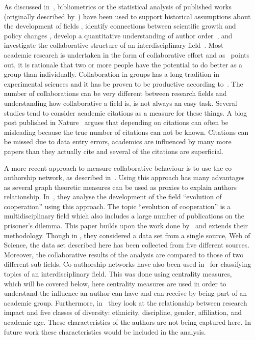 \documentclass{article}
\theoremstyle{definition}
\begin{document}
As discussed in~\cite{youngblood2018}, bibliometrics or the statistical analysis
of published works (originally described by~\cite{pritchard1969}) 
have been used to support historical assumptions about the development of fields
\cite{raina1998}, identify connections between scientific growth and policy changes 
\cite{das2016}, develop a quantitative understanding of author order~\cite{sekara2018},
and investigate the collaborative structure of an interdisciplinary field~\cite{Liu2015}.
Most academic research is undertaken in the form of collaborative effort and as~\cite{Kyvik2017}
points out, it is rationale that two or more people have the potential to do better
as a group than individually. Collaboration in groups has a long tradition in experimental 
sciences and it has be proven to be productive according to~\cite{Etzkowitz1992}.
The number of collaborations can be very different between research fields and
understanding how collaborative a field is, is not always an easy task.
Several studies tend to consider academic citations as a measure for these things.
A blog post published in Nature~\cite{nature_blog} argues that depending on citations
can often be misleading because the true number of citations can not be
known. Citations can be missed due to data entry errors, academics are influenced
by many more papers than they actually cite and several of the citations are
superficial.

A more recent approach to measure collaborative behaviour is to use the co
authorship network, as described in~\cite{Liu2015}. Using this approach has many
advantages as several graph theoretic measures can be used as proxies to explain
authors relationship. In~\cite{Liu2015}, they analyse the development of the field
``evolution of cooperation'' using this approach. The topic ``evolution of cooperation''
is a multidisciplinary field which also includes a large number of publications
on the prisoner's dilemma. This paper builds upon the work done by~\cite{Liu2015}
and extends their methodology. Though in
\cite{Liu2015}, they considered a data set from a single source, Web of Science,
the data set described here has been collected from five different sources. Moreover, the collaborative
results of the analysis are compared to those of two different sub fields.
Co authorship networks have also been used in~\cite{youngblood2018} for classifying
topics of an interdisciplinary field. This was done using centrality measures,
which will be covered below, here centrality measures are used in order to understand
the influence an author can have and can receive by being part of an academic group.
Furthermore, in~\cite{alshebli2018} they look at the relationship between research
impact and five classes of diversity: ethnicity, discipline, gender, affiliation,
and academic age. These characteristics of the authors are not being captured here.
In future work these characteristics would be included in the analysis.
\end{document}
